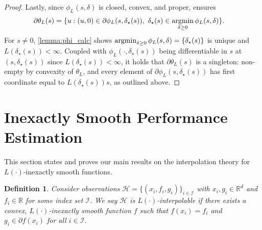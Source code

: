 \documentclass[11pt, hidelinks]{article}
\numberwithin{equation}{section}
\newcommand{\argmin}{\operatornamewithlimits{argmin}}
\theoremstyle{thmstyletwo}%
\newtheorem{definition}[thm]{Definition}
\numberwithin{equation}{section}
\newcommand{\R}{\mathbb{R}}
\newcommand{\Ical}{\mathcal{I}}
\begin{document}
\begin{proof}
Lastly, since $\phi_L(s,\delta)$ is closed, convex, and proper, \cite[Theorem 3.101]{Hoheisel2019} ensures \begin{align*}\partial \theta_L(s) &= \{u : (u,0) \in \partial \phi_L(s,\delta_\star(s)), \ \delta_\star(s) \in \argmin_{\delta \geq 0} \phi_L(s, \delta)\}.\end{align*}
For $s \ne 0$, \cref{lemma:phi_calc} shows $\argmin_{\delta \geq 0} \phi_L(s,\delta) = \{\delta_\star(s)\}$ is unique and $L(\delta_\star(s)) < \infty$. Coupled with $\phi_L(\cdot,\delta_\star(s))$ being differentiable in $s$ at $(s, \delta_\star(s))$ since $L(\delta_\star(s)) < \infty$, it holds that $\partial \theta_L(s)$ is a singleton: non-empty by convexity of $\theta_L$, and every element of $\partial\phi_L(s, \delta_\star(s))$ has first coordinate equal to $L(\delta_\star(s))s$, as outlined above. 
\end{proof}
















\section{Inexactly Smooth Performance Estimation}\label{sec:Interpolation}
This section states and proves our main results on the interpolation theory for $L(\cdot)$-inexactly smooth functions. 


\begin{definition}\label{def:L()-interpolation}
    Consider observations $\mathcal{H} = \{(x_i,f_i,g_i)\}_{i\in\Ical}$ with $x_i, g_i \in \R^d$ and $f_i \in \R$ for some index set $\Ical$. We say $\mathcal{H}$ is ${L(\cdot)}$-interpolable if there exists a convex, $L(\cdot)$-inexactly smooth function $f$ such that $f(x_i) = f_i$ and $g_i \in \partial f(x_i)$ for all $i \in \Ical$. 
\end{definition}
\end{document}
